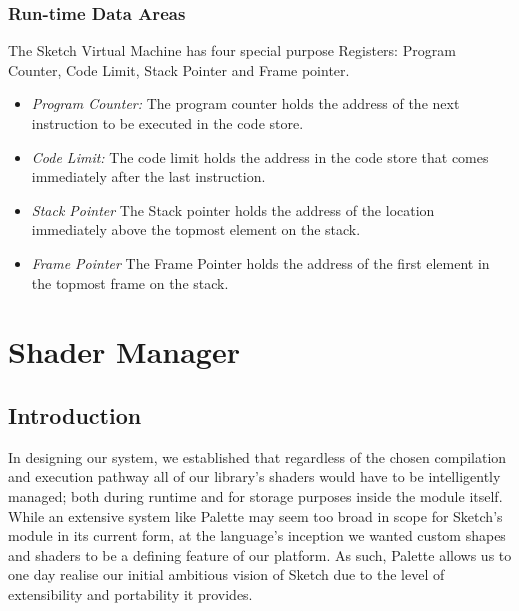 \documentclass{l3proj}
\begin{document}
\subsubsection{Run-time Data Areas}
The Sketch Virtual Machine has four special purpose Registers: Program Counter, Code Limit, Stack Pointer and Frame pointer.
\begin{itemize}
	\item\textit{Program Counter:} The program counter holds the address of the next instruction to be executed in the code store.
	\item\textit{Code Limit:} The code limit holds the address in the code store that comes immediately after the last instruction.
	\item\textit{Stack Pointer} The Stack pointer holds the address of the location immediately above the topmost element on the stack.
	\item\textit{Frame Pointer} The Frame Pointer holds the address of the first element in the topmost frame on the stack.
\end{itemize}
\section{Shader Manager}
\label{arch-shad}

\subsection{Introduction}
\label{arch-shad-intro}
In designing our system, we established that regardless of the chosen compilation and execution pathway all of our library's shaders would have to be intelligently managed; both during runtime and for storage purposes inside the module itself. While an extensive system like Palette may seem too broad in scope for Sketch's module in its current form, at the language's inception we wanted custom shapes and shaders to be a defining feature of our platform. As such, Palette allows us to one day realise our initial ambitious vision of Sketch due to the level of extensibility and portability it provides.
\end{document}

